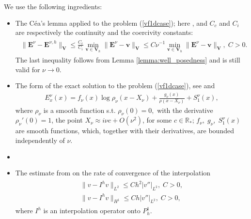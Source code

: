 We use the following ingredients:
\begin{itemize}
 \item The C\'ea's lemma applied to the problem (\ref{vf1dcase}); here , and $C_c$ and $C_i$ are respectively the continuity and the coercivity constants:
\begin{align}
\label{eq:cea}
\begin{split}
 \|\mathbf{E}^{\nu}-\mathbf{E}^{\nu,h}\|_{\mathbf{V}}\leq \frac{C_c}{C_i}\min_{\mathbf{v}\in \mathbf{V}_h}\|\mathbf{E}^{\nu}-\mathbf{v}\|_{\mathbf{V}}
 \leq C\nu^{-1}\min_{\mathbf{v}\in \mathbf{V}_h}\|\mathbf{E}^{\nu}-\mathbf{v}\|_{\mathbf{V}},\; C>0.
 \end{split}
\end{align}
The last inequality follows from Lemma \ref{lemma:well_posedness} and is still valid for $\nu\rightarrow 0$.   
\item The form of the exact solution to the problem (\ref{vf1dcase}), see \cite{Despres_2014} and \cite[Proposition 1]{singular_solutions}
\begin{align}
\label{eq:exact}
 E_x^{\nu}(x)=f_{\nu}(x)\log\rho_{\nu}(x-X_{\nu})+\frac{g_{\nu}(x)}{\rho(x-X_{\nu})}+S_{1}^{\nu}(x),
\end{align}
where $\rho_{\nu}$ is a smooth function s.t. $\rho_{\nu}(0)=0,$ with the derivative $\rho_{\nu}'(0)=1$, 
the point $X_{\nu}\approx i\nu c+O(\nu^2)$, for some $c\in\mathbb{R}_{*}$; $f_{\nu},\; g_{\nu}, \; S_{1}^{\nu}(x)$ are smooth functions, 
which, together with their derivatives, are bounded independently of $\nu$. 
\item {}
\item The estimate from \cite[Chapter 0]{brenner} on the rate of convergence of the interpolation 
\begin{align}
\label{eq:interp}
\begin{split}
 \|v-I^{h}v\|_{L^2}\leq Ch^2\left|v''\right|_{L^2},\; C>0,\\
 \|v-I^{h}v\|_{H^1}\leq Ch|v''|_{L^2},\; C>0, 
 \end{split}
\end{align}
where $I^{h}$ is an interpolation operator onto $P_{h}^{1}$. 
\end{itemize}

